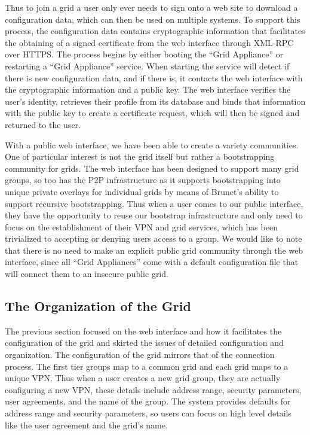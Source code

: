 \documentclass[conference]{IEEEtran}
\begin{document}
Thus to join a grid a user only ever needs to sign onto a web site to download
a configuration data, which can then be used on multiple systems.  To support
this process, the configuration data contains cryptographic information that
facilitates the obtaining of a signed certificate from the web interface
through XML-RPC over HTTPS.  The process begins by either booting the ``Grid
Appliance'' or restarting a ``Grid Appliance'' service.  When starting the
service will detect if there is new configuration data, and if there is, it
contacts the web interface with the cryptographic information and a public key.
The web interface verifies the user's identity, retrieves their profile from
its database and binds that information with the public key to create a
certificate request, which will then be signed and returned to the user.

With a public web interface, we have been able to create a variety communities.
One of particular interest is not the grid itself but rather a bootstrapping
community for grids.  The web interface has been designed to support many grid
groups, so too has the P2P infrastructure as it supports bootstrapping into
unique private overlays for individual grids by means of Brunet's ability to
support recursive bootstrapping.  Thus when a user comes to our public
interface, they have the opportunity to reuse our bootstrap infrastructure and
only need to focus on the establishment of their VPN and grid services, which
has been trivialized to accepting or denying users access to a group.  We would
like to note that there is no need to make an explicit public grid community
through the web interface, since all ``Grid Appliances'' come with a default
configuration file that will connect them to an insecure public grid.  

\subsection{The Organization of the Grid}

The previous section focused on the web interface and how it facilitates the
configuration of the grid and skirted the issues of detailed configuration and
organization.  The configuration of the grid mirrors that of the connection
process.  The first tier groups map to a common grid and each grid maps to a
unique VPN.  Thus when a user creates a new grid group, they are actually
configuring a new VPN, these details include address range, security
parameters, user agreements, and the name of the group.  The system provides
defaults for address range and security parameters, so users can focus on high
level details like the user agreement and the grid's name.
\end{document}
